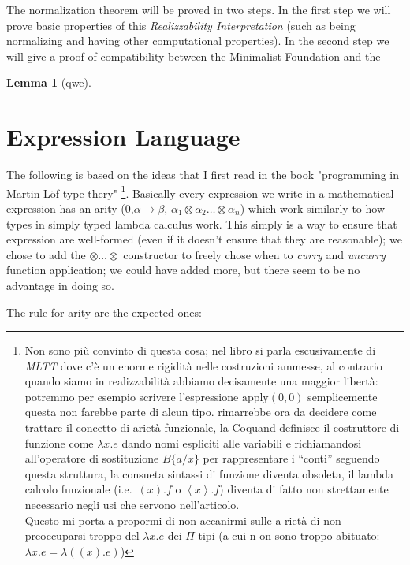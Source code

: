 \documentclass[11pt,a5paper,draft,oneside]{amsbook}
\theoremstyle{plain}%
\newtheorem{lem}[thm]{Lemma}
\theoremstyle{definition}
\theoremstyle{remark}
\begin{document}
	The normalization theorem will be proved in two steps. In the first step we will prove basic properties of this \emph{Realizzability Interpretation} (such as being normalizing and having other computational properties). In the second step we will give a proof of compatibility between the Minimalist Foundation and the 
	
 	
	\begin{lem}[qwe]
	
	\end{lem}
\chapter{Expression Language}
	The following is based on the ideas that I first read in the book "programming in Martin Löf type thery" 
	\footnote{\label{qwe13}Non sono più convinto di questa cosa; nel libro si parla escusivamente di \emph{MLTT} dove c'è un enorme rigidità nelle costruzioni ammesse, al contrario quando siamo in realizzabilità abbiamo decisamente una maggior libertà: potremmo per esempio scrivere l'espressione $\text{apply}(0,0)$ semplicemente questa non farebbe parte di alcun tipo.
	rimarrebbe ora da decidere come trattare il concetto di arietà funzionale, la Coquand definisce il costruttore di funzione come $\lambda x . e$ dando nomi espliciti alle variabili e richiamandosi all'operatore di sostituzione $B\{a/x\}$ per rappresentare i ``conti'' seguendo questa struttura, la consueta sintassi di funzione diventa obsoleta, il lambda calcolo funzionale (i.e.\ $(x).f$ o $\left\langle x\right\rangle.f$) diventa di fatto non strettamente necessario negli usi che servono nell'articolo. \\
	Questo mi porta a propormi di non accanirmi sulle a
	rietà di non preoccuparsi troppo del $\lambda x.e$ dei $\Pi$-tipi (a cui n
	on sono troppo abituato: $\lambda x.e 
	= \lambda ((x).e)$) 
	}. 
	Basically every expression we write in a mathematical expression has an arity (0,$\alpha\rightarrow\beta$, $\alpha_1\otimes\alpha_2\ldots\otimes\alpha_n$) which work similarly to how types in simply typed lambda calculus work. 
	This simply is a way to ensure that expression are well-formed (even if it doesn't ensure that they are reasonable); we chose to add the $\otimes\ldots\otimes$ constructor to freely chose when to \emph{curry} and \emph{uncurry} function application; we could have added more, but there seem to be no advantage in doing so.
	
	The rule for arity are the expected ones:
	
\end{document}
